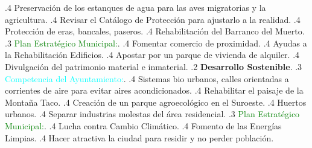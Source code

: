 {.4 Preservación de los estanques de agua para las aves migratorias y la agricultura. %
.4 Revisar el Catálogo de Protección para ajustarlo a la realidad. %
.4 Protección de eras, bancales, paseros. %
.4 Rehabilitación del Barranco del Muerto. %
.3 \textcolor{green}{Plan Estratégico Municipal:}. %
.4 Fomentar comercio de proximidad. %
.4 Ayudas a la Rehabilitación Edificios. %
.4 Apostar por un parque de vivienda de alquiler. %
.4 Divulgación del patrimonio material e inmaterial. %
.2 \textbf{Desarrollo Sostenible}. %
.3 \textcolor{cyan}{Competencia del Ayuntamiento:}. %
.4 Sistemas bio urbanos, calles orientadas a corrientes de aire para evitar aires acondicionados. %
.4 Rehabilitar el paisaje de la Montaña Taco. %
.4 Creación de un parque agroecológico en el Suroeste. %
.4 Huertos urbanos. %
.4 Separar industrias molestas del área residencial. %
.3 \textcolor{green}{Plan Estratégico Municipal:}. %
.4 Lucha contra Cambio Climático. %
.4 Fomento de las Energías Limpias. %
.4 Hacer atractiva la ciudad para residir y no perder población. %
}

% 